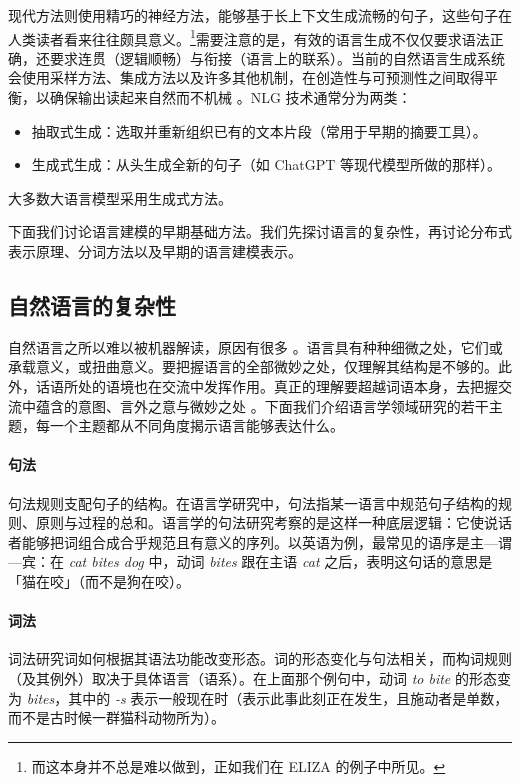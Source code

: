 现代方法则使用精巧的神经方法，能够基于长上下文生成流畅的句子，这些句子在人类读者看来往往颇具意义。\footnote{而这本身并不总是难以做到，正如我们在 ELIZA 的例子中所见。}需要注意的是，有效的语言生成不仅仅要求语法正确，还要求连贯（逻辑顺畅）与衔接（语言上的联系）。当前的自然语言生成系统会使用采样方法、集成方法以及许多其他机制，在创造性与可预测性之间取得平衡，以确保输出读起来自然而不机械 \citep{li-jurafsky-2017-neural, 10.1145/3554727, gatt2018survey}。NLG 技术通常分为两类：
\begin{itemize}
    \item 抽取式生成：选取并重新组织已有的文本片段（常用于早期的摘要工具）。
    \item 生成式生成：从头生成全新的句子（如 ChatGPT 等现代模型所做的那样）。
\end{itemize}
大多数大语言模型采用生成式方法。

下面我们讨论语言建模的早期基础方法。我们先探讨语言的复杂性，再讨论分布式表示原理、分词方法以及早期的语言建模表示。

\subsection{自然语言的复杂性}
自然语言之所以难以被机器解读，原因有很多 %
。语言具有种种细微之处，它们或承载意义，或扭曲意义。要把握语言的全部微妙之处，仅理解其结构是不够的。此外，话语所处的语境也在交流中发挥作用。真正的理解要超越词语本身，去把握交流中蕴含的意图、言外之意与微妙之处 \citep{wittgenstein1953philosophical, Grice_1975, krause-vossen-2024-gricean-maxims}。下面我们介绍语言学领域研究的若干主题，每一个主题都从不同角度揭示语言能够表达什么。

\paragraph{句法} 句法规则支配句子的结构。在语言学研究中，句法指某一语言中规范句子结构的规则、原则与过程的总和。语言学的句法研究考察的是这样一种底层逻辑：它使说话者能够把词组合成合乎规范且有意义的序列。以英语为例，最常见的语序是主—谓—宾：在 {\em cat bites dog} 中，动词 {\em bites} 跟在主语 {\em cat} 之后，表明这句话的意思是「猫在咬」（而不是狗在咬）。
    
\paragraph{词法} 词法研究词如何根据其语法功能改变形态。词的形态变化与句法相关，而构词规则（及其例外）取决于具体语言（语系）。在上面那个例句中，动词 {\em to bite} 的形态变为 {\em bites}，其中的 {\em -s} 表示一般现在时（表示此事此刻正在发生，且施动者是单数，而不是古时候一群猫科动物所为）。
    
